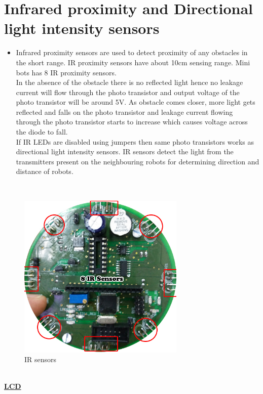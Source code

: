 \documentclass[a4paper,12pt,oneside]{book}
\begin{document}
\chapter{Infrared proximity and Directional light intensity sensors}
\begin{itemize}
	\item {
		Infrared proximity sensors are used to detect proximity of any obstacles in the short range. IR
		proximity sensors have about 10cm sensing range. Mini bots has 8 IR proximity sensors.\\
		In the absence of the obstacle there is no reflected light hence no leakage current will flow
		through the photo transistor and output voltage of the photo transistor will be around 5V. As obstacle
		comes closer, more light gets reflected and falls on the photo transistor and leakage current flowing
		through the photo transistor starts to increase which causes voltage across the diode to fall.\\
		If IR LEDs are disabled using jumpers then same photo transistors works as directional light
		intensity sensors.
		IR sensors detect the light from the transmitters present on the neighbouring robots for determining direction and distance of robots.\\
	}
	\end{itemize}

	\hfill\\
	\begin{figure}[h!]
		\includegraphics[width=300px]{./HardwareManual/IR_Sensor.jpg}
		\caption{IR sensors}
	\end{figure}	
	\hfill\\
	\newpage
	\underline{\textbf{\Large{LCD}}}
		
\end{document}
